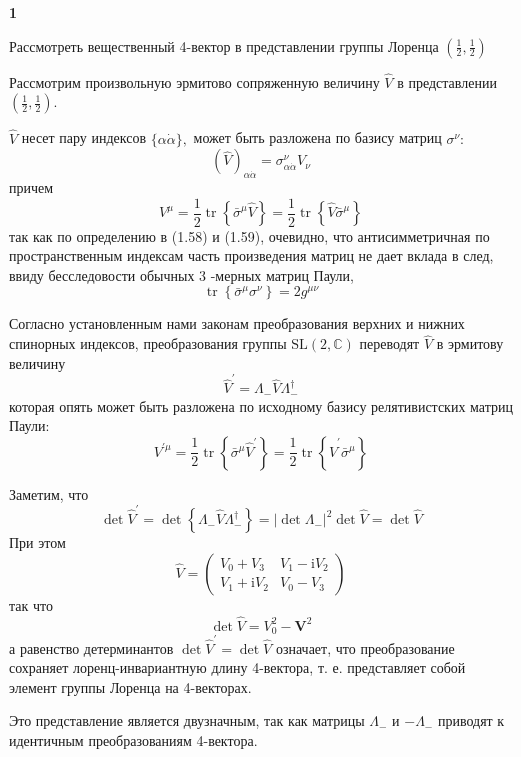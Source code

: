 \documentclass[a4paper,12pt]{article} %
\begin{document}
\begin{task}\textbf{1}

Рассмотреть вещественный 4-вектор в представлении группы Лоренца $\left(\frac{1}{2}, \frac{1}{2}\right)$



Рассмотрим произвольную эрмитово сопряженную величину
$\hat{V}$ в представлении 
$\left(\frac{1}{2}, \frac{1}{2}\right)$.


$\hat{V}$ несет пару индексов $\{\alpha \dot{\alpha}\},$ 
может быть разложена по базису матриц $\sigma^{\nu}:$
$$
(\hat{V})_{\alpha \dot{\alpha}}
=
\sigma_{\alpha \dot{\alpha}}^{\nu} V_{\nu}
$$
причем
$$
V^{\mu}
=
\frac{1}{2} \operatorname{tr}\left\{\bar{\sigma}^{\mu} \hat{V}\right\}
=
\frac{1}{2} \operatorname{tr}\left\{\hat{V} \bar{\sigma}^{\mu}\right\}
$$
так как по определению в (1.58) и (1.59), очевидно, 
что антисимметричная по пространственным индексам часть произведения матриц не дает вклада в след, 
ввиду бесследовости обычных 3 -мерных матриц Паули,
$$
\operatorname{tr}\left\{\bar{\sigma}^{\mu} \sigma^{\nu}\right\}=2 g^{\mu \nu}
$$


Согласно установленным нами законам преобразования верхних и нижних спинорных индексов, 
преобразования группы $\mathrm{SL}(2, \mathbb{C})$ переводят $\hat{V}$ в эрмитову величину
$$
\hat{V}^{\prime}=\Lambda_{-} \hat{V} \Lambda_{-}^{\dagger}
$$
которая опять может быть разложена по исходному базису релятивистских матриц Паули:
$$
V^{\prime \mu}=
\frac{1}{2} \operatorname{tr}\left\{\bar{\sigma}^{\mu} \hat{V}^{\prime}\right\}=
\frac{1}{2} \operatorname{tr}\left\{\hat{V}^{\prime} \bar{\sigma}^{\mu}\right\}
$$


Заметим, что
$$
\operatorname{det} \hat{V}^{\prime}
=
\operatorname{det}\left\{\Lambda_{-} \hat{V} \Lambda_{-}^{\dagger}\right\}
=
\left|\operatorname{det} \Lambda_{-}\right|^{2} \operatorname{det} \hat{V}
=
\operatorname{det} \hat{V}
$$
При этом
$$
\hat{V}=
\left(\begin{array}{cc}
	V_{0}+V_{3} & V_{1}-\mathrm{i} V_{2} 
	\\
	V_{1}+\mathrm{i} V_{2} & V_{0}-V_{3}
\end{array}\right)
$$
так что
$$
\operatorname{det} \hat{V}=V_{0}^{2}-\boldsymbol{V}^{2}
$$
а равенство детерминантов $ \operatorname{det} \hat{V}^{\prime}
=
\operatorname{det} \hat{V} $ 
означает, что преобразование сохраняет лоренц-инвариантную длину 4-вектора, 
т. е. представляет собой элемент группы Лоренца на 4-векторах. 


Это представление является двузначным, так как матрицы $\Lambda_{-}$ и $-\Lambda_{-}$ приводят к идентичным преобразованиям 4-вектора. 






\end{task}
\end{document}
